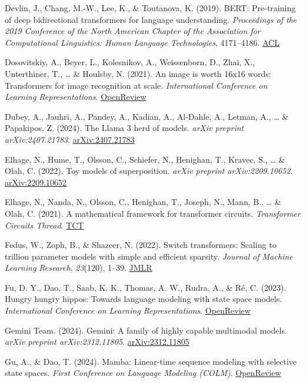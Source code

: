 \documentclass[10pt,twocolumn]{article}
\begin{document}
Devlin, J., Chang, M.-W., Lee, K., \& Toutanova, K. (2019). BERT: Pre-training of deep bidirectional transformers for language understanding. \emph{Proceedings of the 2019 Conference of the North American Chapter of the Association for Computational Linguistics: Human Language Technologies}, 4171--4186. \href{https://aclanthology.org/N19-1423}{ACL}

Dosovitskiy, A., Beyer, L., Kolesnikov, A., Weissenborn, D., Zhai, X., Unterthiner, T., \ldots{} \& Houlsby, N. (2021). An image is worth 16x16 words: Transformers for image recognition at scale. \emph{International Conference on Learning Representations}. \href{https://openreview.net/forum?id=YicbFdNTTy}{OpenReview}

Dubey, A., Jauhri, A., Pandey, A., Kadian, A., Al-Dahle, A., Letman, A., \ldots{} \& Papakipos, Z. (2024). The Llama 3 herd of models. \emph{arXiv preprint arXiv:2407.21783}. \href{https://arxiv.org/abs/2407.21783}{arXiv:2407.21783}

Elhage, N., Hume, T., Olsson, C., Schiefer, N., Henighan, T., Kravec, S., \ldots{} \& Olah, C. (2022). Toy models of superposition. \emph{arXiv preprint arXiv:2209.10652}. \href{https://arxiv.org/abs/2209.10652}{arXiv:2209.10652}

Elhage, N., Nanda, N., Olsson, C., Henighan, T., Joseph, N., Mann, B., \ldots{} \& Olah, C. (2021). A mathematical framework for transformer circuits. \emph{Transformer Circuits Thread}. \href{https://transformer-circuits.pub/2021/framework/index.html}{TCT}

Fedus, W., Zoph, B., \& Shazeer, N. (2022). Switch transformers: Scaling to trillion parameter models with simple and efficient sparsity. \emph{Journal of Machine Learning Research}, \emph{23}(120), 1--39. \href{https://jmlr.org/papers/v23/21-0998.html}{JMLR}

Fu, D. Y., Dao, T., Saab, K. K., Thomas, A. W., Rudra, A., \& Ré, C. (2023). Hungry hungry hippos: Towards language modeling with state space models. \emph{International Conference on Learning Representations}. \href{https://openreview.net/forum?id=COZDy0WYGg}{OpenReview}

Gemini Team. (2024). Gemini: A family of highly capable multimodal models. \emph{arXiv preprint arXiv:2312.11805}. \href{https://arxiv.org/abs/2312.11805}{arXiv:2312.11805}

Gu, A., \& Dao, T. (2024). Mamba: Linear-time sequence modeling with selective state spaces. \emph{First Conference on Language Modeling (COLM)}. \href{https://openreview.net/forum?id=tEYskw1VY2}{OpenReview}
\end{document}
